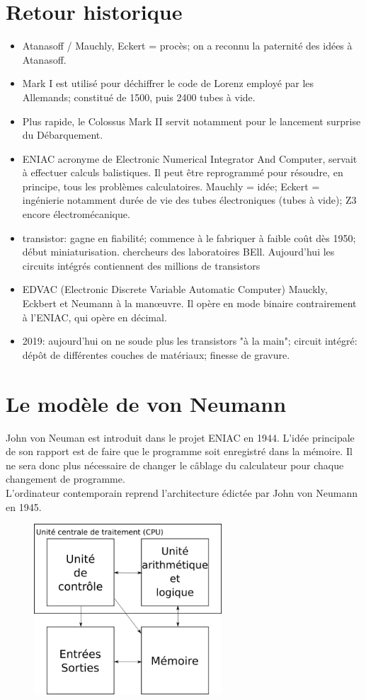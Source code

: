\documentclass[a4paper,11pt]{article}
\begin{document}
\begin{Form}
\section*{Retour historique}
\begin{itemize}
\item Atanasoff / Mauchly, Eckert = procès; on a reconnu la paternité des idées à Atanasoff.
\item Mark I est utilisé pour déchiffrer le code de Lorenz employé par les Allemands; constitué de 1500, puis 2400 tubes à vide.
\item Plus rapide, le Colossus Mark II servit notamment pour le lancement surprise du Débarquement.
\item ENIAC acronyme de Electronic Numerical Integrator And Computer, servait à effectuer calculs balistiques. Il peut être reprogrammé pour résoudre, en principe, tous les problèmes calculatoires. Mauchly = idée; Eckert = ingénierie notamment durée de vie des tubes électroniques (tubes à vide); Z3 encore électromécanique.
\item transistor: gagne en fiabilité; commence à le fabriquer à faible coût dès 1950; début miniaturisation. chercheurs des laboratoires BEll. Aujourd'hui les circuits intégrés contiennent des millions de transistors
\item EDVAC (Electronic Discrete Variable Automatic Computer) Mauckly, Eckbert et Neumann à la manœuvre. Il opère en mode binaire contrairement à l'ENIAC, qui opère en décimal.
\item 2019: aujourd'hui on ne soude plus les transistors "à la main"; circuit intégré: dépôt de différentes couches de matériaux; finesse de gravure.
\end{itemize}
\section{Le modèle de von Neumann}
John von Neuman est introduit dans le projet ENIAC en 1944. L'idée principale de son rapport est de faire que le programme soit enregistré dans la mémoire. Il ne sera donc plus nécessaire de changer le câblage du calculateur pour chaque changement de programme.\\
L'ordinateur contemporain reprend l'architecture édictée par John von Neumann en 1945.
\begin{figure}[!h]
\centering
\includegraphics[width=7cm]{ressources/von-neumann.png}
\label{neumann}
\end{figure}

\end{Form}
\end{document}
